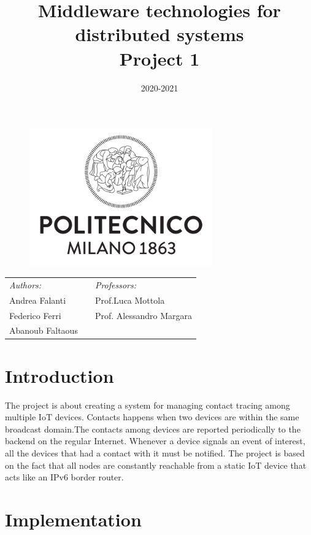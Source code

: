 \documentclass[10pt]{article}
\title{Middleware technologies for distributed systems\\Project 1}
\date{2020-2021}
\begin{document}
	\begin{titlepage}
		\begin{figure}[t]
			\centering\includegraphics[width=0.7\textwidth]{../../docResources/logo_polimi}
		\end{figure}
		\maketitle
		
		\large
		\begin{tabularx}{\linewidth}{@{}lXl@{}}
			\textit{Authors:}  & & \textit{Professors:} \\
			Andrea Falanti      & & Prof.\@ Luca Mottola\\
			Federico Ferri  & & Prof. Alessandro Margara\\
			Abanoub Faltaous & & \\
		\end{tabularx}		
		\thispagestyle{empty}
	\end{titlepage}
	
	\tableofcontents
	\newpage
	
	\section{Introduction}
	The project is about creating a system for managing contact tracing among multiple IoT devices. Contacts happens when two devices are within the same broadcast domain.The contacts among devices are reported periodically to the backend on the regular Internet. Whenever a device signals an event of interest, all the devices that had a contact with it must be notified. The project is based on the fact that all nodes are constantly reachable from a static IoT device that acts like an IPv6 border router.   


	\section{Implementation}
\end{document}
